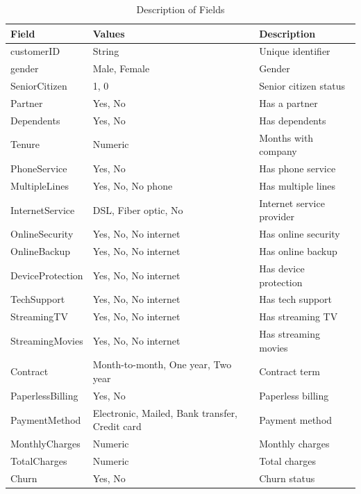 \documentclass[12pt]{article}
\begin{document}
\begin{table}[ht]
  \centering
  \small
  \begin{tabular}{|l|l|l|}
    \hline
    \textbf{Field} & \textbf{Values} & \textbf{Description} \\
    \hline
    customerID & String & Unique identifier \\
    gender & Male, Female & Gender \\
    SeniorCitizen & 1, 0 & Senior citizen status \\
    Partner & Yes, No & Has a partner \\
    Dependents & Yes, No & Has dependents \\
    Tenure & Numeric & Months with company \\
    PhoneService & Yes, No & Has phone service \\
    MultipleLines & Yes, No, No phone & Has multiple lines \\
    InternetService & DSL, Fiber optic, No & Internet service provider \\
    OnlineSecurity & Yes, No, No internet & Has online security \\
    OnlineBackup & Yes, No, No internet & Has online backup \\
    DeviceProtection & Yes, No, No internet & Has device protection \\
    TechSupport & Yes, No, No internet & Has tech support \\
    StreamingTV & Yes, No, No internet & Has streaming TV \\
    StreamingMovies & Yes, No, No internet & Has streaming movies \\
    Contract & Month-to-month, One year, Two year & Contract term \\
    PaperlessBilling & Yes, No & Paperless billing \\
    PaymentMethod & Electronic, Mailed, Bank transfer, Credit card & Payment method \\
    MonthlyCharges & Numeric & Monthly charges \\
    TotalCharges & Numeric & Total charges \\
    Churn & Yes, No & Churn status \\
    \hline
  \end{tabular}
  \caption{Description of Fields}
  \end{table}
\end{document}
